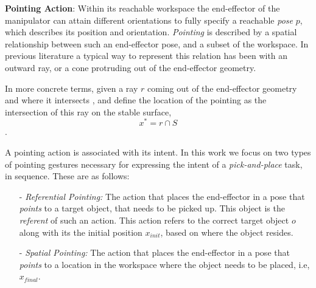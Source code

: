 \noindent\textbf{Pointing Action}: Within its reachable workspace the end-effector of the manipulator can attain different orientations to fully specify a reachable \textit{pose} $p$, which describes its position and orientation. \textit{Pointing} is described by a spatial relationship between such an end-effector pose, and a subset of the workspace. In previous literature a typical way to represent this relation has been with an outward ray, or a cone protruding out of the end-effector geometry. 

In more concrete terms, given a ray $r$ coming out of the end-effector geometry and where it intersects , and define the location of the pointing as the intersection of this ray on the stable surface, $$x^*= r\cap S$$.

A pointing action is associated with its intent. In this work we focus on two types of pointing gestures necessary for expressing the intent of a \textit{pick-and-place} task, in sequence. These are as follows:
\begin{itemize}
    \item [-] \textit{Referential Pointing:} The action that places the end-effector in a pose that \textit{points} to a target object, that needs to be picked up. This object is the \textit{referent} of such an action. This action refers to the correct target object $o$ along with its the initial position $x_{init}$, based on where the object resides.
    \item [-] \textit{Spatial Pointing:} The action that places the end-effector in a pose that \textit{points} to a location in the workspace where the object needs to be placed, i.e, $x_{final}$.
\end{itemize}


